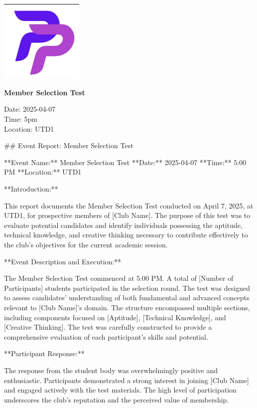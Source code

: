 \documentclass{article}
\begin{document}
\begin{center}
    \includegraphics[width=0.3\textwidth]{logo.png}
    \vspace{0.5cm}

   \LARGE \textbf{Member Selection Test}

    \vspace{0.3cm}
    \normalsize Date: 2025-04-07 \\
    Time: 5pm \\
    Location: UTD1
\end{center}

\vspace{1cm}

\#\# Event Report: Member Selection Test

**Event Name:** Member Selection Test
**Date:** 2025-04-07
**Time:** 5:00 PM
**Location:** UTD1

**Introduction:**

This report documents the Member Selection Test conducted on April 7, 2025, at UTD1, for prospective members of [Club Name]. The purpose of this test was to evaluate potential candidates and identify individuals possessing the aptitude, technical knowledge, and creative thinking necessary to contribute effectively to the club's objectives for the current academic session.

**Event Description and Execution:**

The Member Selection Test commenced at 5:00 PM. A total of [Number of Participants] students participated in the selection round. The test was designed to assess candidates' understanding of both fundamental and advanced concepts relevant to [Club Name]'s domain. The structure encompassed multiple sections, including components focused on [Aptitude], [Technical Knowledge], and [Creative Thinking]. The test was carefully constructed to provide a comprehensive evaluation of each participant's skills and potential.

**Participant Response:**

The response from the student body was overwhelmingly positive and enthusiastic. Participants demonstrated a strong interest in joining [Club Name] and engaged actively with the test materials. The high level of participation underscores the club's reputation and the perceived value of membership.
\end{document}
